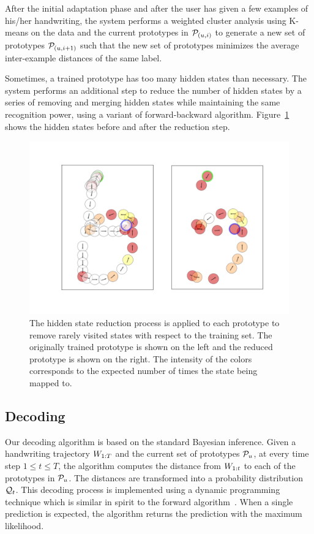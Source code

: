 \documentclass{sigchi}
\begin{document}
After the initial adaptation phase and after the user has given a few
examples of his/her handwriting, the system performs a weighted cluster
analysis using K-means on the data and the current prototypes in
$\mathcal{P}_{(u,i)}$ to generate a new set of prototypes
$\mathcal{P}_{(u,i+1)}$ such that the new set of prototypes minimizes the
average inter-example distances of the same label. 

Sometimes, a trained prototype has too many hidden states than
necessary. The system performs an additional step to reduce the number
of hidden states by a series of removing and merging hidden states
while maintaining the same recognition power, using a variant of
forward-backward algorithm. Figure~\ref{fig:state_reduction} shows the
hidden states before and after the reduction step.

\begin{figure}[!t]
  \centering
  \includegraphics[width=0.9\columnwidth] {figures/state_reduction.png}
  \caption{The hidden state reduction process is applied to each
    prototype to remove rarely visited states with respect to the
    training set. The originally trained prototype is shown on the
    left and the reduced prototype is shown on the right. The
    intensity of the colors corresponds to the expected number of
    times the state being mapped to. }
  \label{fig:state_reduction}
\end{figure}

\subsection{Decoding}

Our decoding algorithm is based on the standard Bayesian inference.
Given a handwriting trajectory $W_{1:{T}}$ and the current set of
prototypes $\mathcal{P}_u$, at every time step $1 \le t \le T$, the
algorithm computes the distance from $W_{1:{t}}$ to each of the
prototypes in $\mathcal{P}_u$. The distances are transformed into a
probability distribution $\mathcal{Q}_{t}$. This decoding process is
implemented using a dynamic programming technique which is similar in
spirit to the forward algorithm~\cite{Bilmes97}. When a single prediction is expected,
the algorithm returns the prediction with the maximum likelihood.
\end{document}
